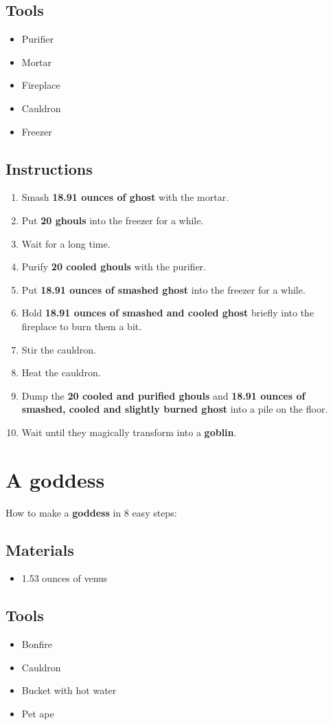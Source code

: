 \documentclass{article}
\begin{document}
\subsection{Tools}\begin{itemize}
\item 
Purifier
\item 
Mortar
\item 
Fireplace
\item 
Cauldron
\item 
Freezer
\end{itemize}
\subsection{Instructions}\begin{enumerate}
\item 
Smash \textbf{18.91 ounces of ghost} with the mortar.
\item 
Put \textbf{20 ghouls} into the freezer for a while.
\item 
Wait for a long time.
\item 
Purify \textbf{20 cooled ghouls} with the purifier.
\item 
Put \textbf{18.91 ounces of smashed ghost} into the freezer for a while.
\item 
Hold \textbf{18.91 ounces of smashed and cooled ghost} briefly into the fireplace to burn them a bit.
\item 
Stir the cauldron.
\item 
Heat the cauldron.
\item 
Dump the \textbf{20 cooled and purified ghouls} and \textbf{18.91 ounces of smashed, cooled and slightly burned ghost} into a pile on the floor.
\item 
Wait until they magically transform into a \textbf{goblin}.
\end{enumerate}
\newpage
\section{A goddess}How to make a \textbf{goddess} in 8 easy steps:

\subsection{Materials}\begin{itemize}
\item 
1.53 ounces of venus
\end{itemize}
\subsection{Tools}\begin{itemize}
\item 
Bonfire
\item 
Cauldron
\item 
Bucket with hot water
\item 
Pet ape
\end{itemize}
\end{document}
